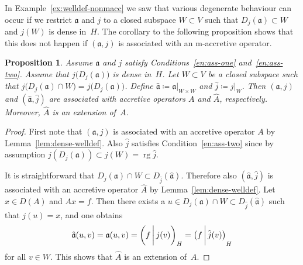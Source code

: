 \documentclass[a4paper,oneside,12pt]{amsart}
\theoremstyle{plain}
\newtheorem{proposition}[theorem]{Proposition}
\theoremstyle{definition}
\begin{document}
In Example~\ref{ex:welldef-nonmacc} we saw that various degenerate behaviour can occur if we restrict ${{\mathfrak{{a}}}}$ and $j$ to a 
closed subspace $W\subset V$ such that $D_j({{\mathfrak{{a}}}})\subset W$ and $j(W)$ is dense in~$H$.
The corollary to the following proposition shows that this does not happen if $({{\mathfrak{{a}}}},j)$ is associated with an {\ensuremath{\text{m}}}-accretive operator.
\begin{proposition}\label{prop:restrict}
Assume ${{\mathfrak{{a}}}}$ and $j$ satisfy Conditions~\ref{en:ass-one} and~\ref{en:ass-two}. 
Assume that $j\bigl(D_j({{\mathfrak{{a}}}})\bigr)$ is dense in~$H$.
Let $W\subset V$ be a closed subspace such that $j\bigl(D_j({{\mathfrak{{a}}}})\cap W\bigr)=j\bigl(D_j({{\mathfrak{{a}}}})\bigr)$.
Define ${{\mathfrak{{\hat{a}}}}}\coloneqq{\ensuremath{{{{\mathfrak{{a}}}}}|_{{W\times W}}}}$ and $\hat{j}\coloneqq{\ensuremath{{j}|_{{W}}}}$.
Then $({{\mathfrak{{a}}}},j)$ and $({{\mathfrak{{\hat{a}}}}},\hat{j})$ are associated with accretive operators $A$ and $\widehat{A}$, respectively.
Moreover, $\widehat{A}$ is an extension of~$A$.
\end{proposition}
\begin{proof}
First note that $({{\mathfrak{{a}}}},j)$ is associated with an accretive operator $A$ by Lemma~\ref{lem:dense-welldef}.
Also $\hat{j}$ satisfies Condition~\ref{en:ass-two} since by assumption $j(D_j({{\mathfrak{{a}}}}))\subset j(W)=\operatorname{rg}\hat{j}$.

It is straightforward that $D_j({{\mathfrak{{a}}}})\cap W\subset D_{\hat{j}}({{\mathfrak{{\hat{a}}}}})$. 
Therefore also $({{\mathfrak{{\hat{a}}}}},\hat{j})$ is associated with an accretive operator $\widehat{A}$ by Lemma~\ref{lem:dense-welldef}.
Let $x\in D(A)$ and $Ax=f$. Then there exists a $u\in D_j({{\mathfrak{{a}}}})\cap W\subset D_{\hat{j}}({{\mathfrak{{\hat{a}}}}})$ such that $j(u)=x$, and one obtains
\[
    {{\mathfrak{{\hat{a}}}}}(u,v) = {{\mathfrak{{a}}}}(u,v)={{\ifthenelse{\equal{auto}{auto}}{\left({f}\mkern3mu{\biggm|}\mkern3mu {j(v)}\right)}{}
\ifthenelse{\equal{auto}{b}}{\bigl({f}\mkern3mu{\biggm|}\mkern3mu {j(v)}\bigr)}{}
\ifthenelse{\equal{auto}{B}}{\Bigl({f}\mkern3mu{\bigm|}\mkern3mu {j(v)}\Bigr)}{}
}}_H={{\ifthenelse{\equal{b}{auto}}{\left({f}\mkern3mu{\biggm|}\mkern3mu {\hat{j}(v)}\right)}{}
\ifthenelse{\equal{b}{b}}{\bigl({f}\mkern3mu{\biggm|}\mkern3mu {\hat{j}(v)}\bigr)}{}
\ifthenelse{\equal{b}{B}}{\Bigl({f}\mkern3mu{\bigm|}\mkern3mu {\hat{j}(v)}\Bigr)}{}
}}_H
\]
for all $v\in W$.
This shows that $\widehat{A}$ is an extension of~$A$.
\end{proof}
\end{document}
